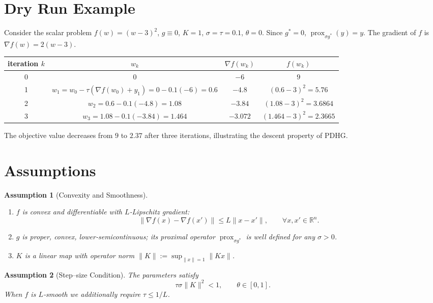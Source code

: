 \documentclass{article}
\newtheorem{assumption}{Assumption}
\newcommand{\prox}{\operatorname{prox}}
\newcommand{\R}{\mathbb{R}}
\begin{document}
\section*{Dry Run Example}
Consider the scalar problem $f(w)=(w-3)^{2}$, $g\equiv0$, $K=1$, $\sigma=\tau=0.1$, $\theta=0$.
Since $g^{*}=0$, $\prox_{\sigma g^{*}}(y)=y$.
The gradient of $f$ is $\nabla f(w)=2(w-3)$.

\begin{center}
\begin{tabular}{c|c|c|c}
iteration $k$ & $w_{k}$ & $\nabla f(w_{k})$ & $f(w_{k})$\\\hline
0 & $0$ & $-6$ & $9$\\
1 & $w_{1}=w_{0}-\tau(\nabla f(w_{0})+y_{1})=0-0.1(-6)=0.6$ & $-4.8$ & $(0.6-3)^{2}=5.76$\\
2 & $w_{2}=0.6-0.1(-4.8)=1.08$ & $-3.84$ & $(1.08-3)^{2}=3.6864$\\
3 & $w_{3}=1.08-0.1(-3.84)=1.464$ & $-3.072$ & $(1.464-3)^{2}=2.3665$
\end{tabular}
\end{center}
The objective value decreases from $9$ to $2.37$ after three iterations, illustrating the descent property of PDHG.

\newpage
\section*{Assumptions}
\begin{assumption}[Convexity and Smoothness]\label{as:convex}
\begin{enumerate}
\item $f$ is convex and differentiable with $L$‑Lipschitz gradient:
\[
\|\nabla f(x)-\nabla f(x')\|\le L\|x-x'\|,\qquad\forall x,x'\in\R^{n}.
\tag{A1}
\]
\item $g$ is proper, convex, lower‑semicontinuous; its proximal operator $\prox_{\sigma g^{*}}$ is well defined for any $\sigma>0$.
\item $K$ is a linear map with operator norm $\|K\|:=\sup_{\|x\|=1}\|Kx\|$.
\end{enumerate}
\end{assumption}
\begin{assumption}[Step–size Condition]\label{as:steps}
The parameters satisfy
\[
\tau\sigma\|K\|^{2}<1,\qquad \theta\in[0,1].
\tag{A2}
\]
When $f$ is $L$‑smooth we additionally require $\tau\le 1/L$.
\end{assumption}
\end{document}
